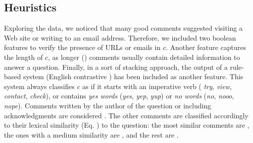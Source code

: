 \subsection{Heuristics}
\label{ssub:heuristics}

Exploring the data, we noticed that many good comments suggested visiting a Web 
site or writing to an email address. Therefore, we included two boolean features 
to verify the presence of URLs or emails in $c$. Another feature captures the 
length of $c$, as longer (\good) comments usually contain detailed information 
to answer a question. Finally, in a sort of stacking approach, the output of a 
rule-based system (English contrastive ) has been included as another
feature. This system always classifies $c$ as \good if it starts with an 
imperative verb (\eg 
\textit{try}, \textit{view}, \textit{contact}, \textit{check}), or contains 
\textit{yes words} (\eg \textit{yes}, \textit{yep}, \textit{yup}) or 
\textit{no words} (\eg \textit{no}, \textit{nooo}, \textit{nope}). Comments 
written by the author of the question or including acknowledgments are 
considered \dial. The other comments are classified accordingly to their lexical 
similarity (Eq. ) to the question: the most similar comments are 
\good, the ones with a medium similarity are \pot, and the rest are \bad. 



% 
% 
% 



